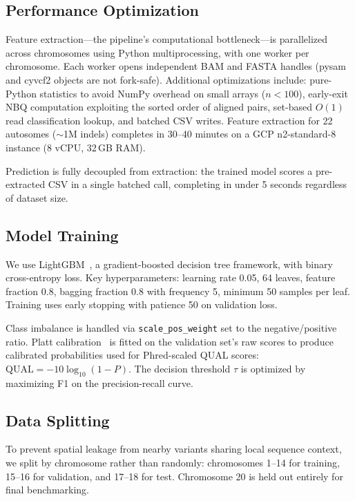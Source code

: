 \documentclass[sigconf]{acmart}
\begin{document}
\subsection{Performance Optimization}
Feature extraction---the pipeline's computational bottleneck---is parallelized across chromosomes using Python multiprocessing, with one worker per chromosome. Each worker opens independent BAM and FASTA handles (pysam and cyvcf2 objects are not fork-safe). Additional optimizations include: pure-Python statistics to avoid NumPy overhead on small arrays ($n < 100$), early-exit NBQ computation exploiting the sorted order of aligned pairs, set-based $O(1)$ read classification lookup, and batched CSV writes. Feature extraction for 22 autosomes ($\sim$1M indels) completes in 30--40 minutes on a GCP n2-standard-8 instance (8 vCPU, 32\,GB RAM).

Prediction is fully decoupled from extraction: the trained model scores a pre-extracted CSV in a single batched call, completing in under 5 seconds regardless of dataset size.

\subsection{Model Training}
We use LightGBM~\cite{ke2017lightgbm}, a gradient-boosted decision tree framework, with binary cross-entropy loss. Key hyperparameters: learning rate 0.05, 64 leaves, feature fraction 0.8, bagging fraction 0.8 with frequency 5, minimum 50 samples per leaf. Training uses early stopping with patience 50 on validation loss.

Class imbalance is handled via \texttt{scale\_pos\_weight} set to the negative/positive ratio. Platt calibration~\cite{platt1999probabilistic} is fitted on the validation set's raw scores to produce calibrated probabilities used for Phred-scaled QUAL scores: $\text{QUAL} = -10 \log_{10}(1 - P)$. The decision threshold $\tau$ is optimized by maximizing F1 on the precision-recall curve.

\subsection{Data Splitting}
To prevent spatial leakage from nearby variants sharing local sequence context, we split by chromosome rather than randomly: chromosomes 1--14 for training, 15--16 for validation, and 17--18 for test. Chromosome 20 is held out entirely for final benchmarking.
\end{document}
